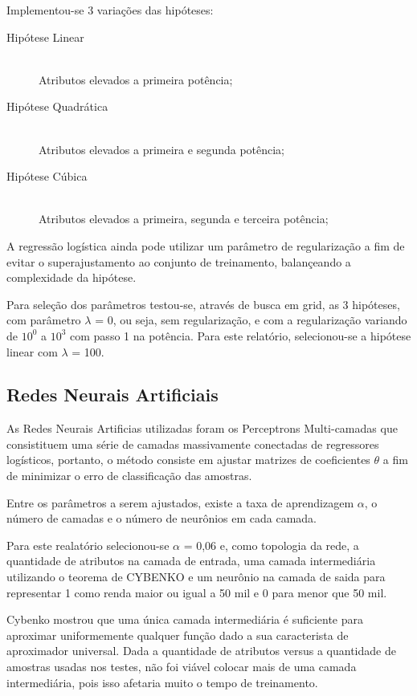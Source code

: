 Implementou-se 3 variações das hipóteses:

\begin{description}
\item[Hipótese Linear] \hfill \\ Atributos elevados a primeira potência;
\item[Hipótese Quadrática] \hfill \\ Atributos elevados a primeira e segunda potência;
\item[Hipótese Cúbica] \hfill \\ Atributos elevados a primeira, segunda e terceira potência;
\end{description}

A regressão logística ainda pode utilizar um parâmetro de regularização a fim de evitar o superajustamento ao conjunto de treinamento, balançeando a complexidade da hipótese.

Para seleção dos parâmetros testou-se, através de busca em grid, as 3 hipóteses, com parâmetro \(\lambda\) = 0, ou seja, sem regularização, e com a regularização variando de \(10^0\) a \(10^3\) com passo 1 na potência. Para este relatório, selecionou-se a hipótese linear com \(\lambda\) = 100.

\subsection{Redes Neurais Artificiais}

As Redes Neurais Artificias utilizadas foram os Perceptrons Multi-camadas que consistituem uma série de camadas massivamente conectadas de regressores logísticos, portanto, o método consiste em ajustar matrizes de coeficientes \(\theta\) a fim de minimizar o erro de classificação das amostras.

Entre os parâmetros a serem ajustados, existe a taxa de aprendizagem \(\alpha\), o número de camadas e o número de neurônios em cada camada.

Para este realatório selecionou-se \(\alpha\) = 0,06 e, como topologia da rede, a quantidade de atributos na camada de entrada, uma camada intermediária utilizando o teorema de CYBENKO e um neurônio na camada de saida para representar 1 como renda maior ou igual a 50 mil e 0 para menor que 50 mil.

Cybenko mostrou que uma única camada intermediária é suficiente para aproximar uniformemente qualquer função dado a sua caracterista de aproximador universal\cite{cybenko}. Dada a quantidade de atributos versus a quantidade de amostras usadas nos testes, não foi viável colocar mais de uma camada intermediária, pois isso afetaria muito o tempo de treinamento.

